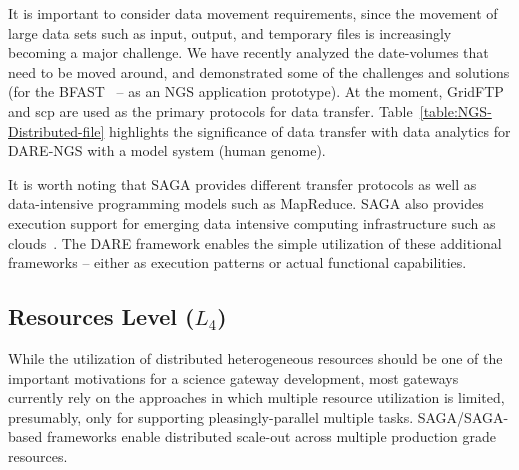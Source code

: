 \documentclass[]{svjour3}
\begin{document}
It is important to consider data movement requirements, since the
movement of large data sets such as input, output, and temporary files is
increasingly becoming a major challenge. We have recently analyzed the
date-volumes that need to be moved around, and demonstrated some of
the challenges and solutions (for the BFAST~\cite{ecmls11} -- as an NGS
application prototype). At the moment, GridFTP and scp are used as
the primary protocols for data
transfer. Table~\ref{table:NGS-Distributed-file} highlights the
significance of data transfer with data analytics for DARE-NGS with a
model system (human genome).

It is worth noting that SAGA provides different transfer protocols
as well as data-intensive programming models
such as MapReduce. SAGA also provides execution support for emerging 
data intensive computing infrastructure such as clouds~\cite{abstractions-azure,saga-ccgrid10}.
The DARE framework enables the simple utilization of these additional frameworks --
either as execution patterns or actual functional capabilities.






\subsection{Resources Level ($L_4$)} 
While the utilization of distributed
heterogeneous resources should be one of the important motivations for a
science gateway development, most gateways currently rely on the
approaches in which multiple resource utilization is limited,
presumably, only for supporting pleasingly-parallel multiple tasks.
SAGA/SAGA-based frameworks enable distributed scale-out across
multiple production grade resources.
\end{document}
